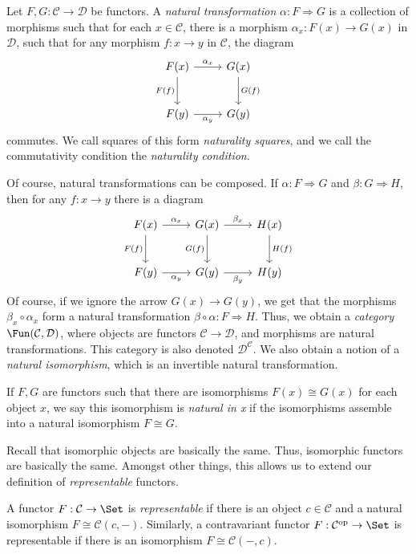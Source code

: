 \documentclass[11pt, A4]{article}
\begin{document}
\begin{definition}\label{5.1}
	Let $F,G : \mathcal{C}  \to \mathcal{D} $ be functors. A \emph{natural transformation} $\alpha : F \Rightarrow G$ is a collection of morphisms such that for each $x\in \mathcal{C} $, there is a morphism $\alpha _x : F(x) \to G(x)$ in $\mathcal{D} $, such that for any morphism $f : x \to y$ in $\mathcal{C} $, the diagram
	\[\begin{tikzcd}[row sep = 2.5em, column sep = 2.5em]
	F(x)\ar[" \alpha _x ", r] \ar[" F(f) "', d]  & G(x)\ar[" G(f) ", d]  \\
	F(y)\ar[" \alpha _y "', r]  & G(y)
	\end{tikzcd}\]
	commutes. We call squares of this form \emph{naturality squares}, and we call the commutativity condition the \emph{naturality condition}.
\end{definition}
Of course, natural transformations can be composed. If $\alpha : F \Rightarrow G$ and $\beta : G \Rightarrow H$, then for any $f : x \to y$ there is a diagram
\[\begin{tikzcd}[row sep = 2.5em, column sep = 2.5em]
F(x)\ar[" \alpha _x ", r] \ar[" F(f) "', d]  & G(x)\ar[" \beta _x ", r] \ar[" G(f) "', d]  & H(x)\ar[" H(f) ", d]  \\
F(y)\ar[" \alpha _y "', r]  & G(y)\ar[" \beta _y "', r]  & H(y)
\end{tikzcd}\]
Of course, if we ignore the arrow $G(x)\to G(y)$, we get that the morphisms $\beta _x \circ \alpha _x$ form a natural transformation $\beta \circ \alpha : F \Rightarrow H$. Thus, we obtain a \emph{category} $\Fun(\mathcal{C} ,\mathcal{D} )$, where objects are functors $\mathcal{C} \to \mathcal{D} $, and morphisms are natural transformations. This category is also denoted $\mathcal{D} ^\mathcal{C} $. We also obtain a notion of a \emph{natural isomorphism}, which is an invertible natural transformation.

If $F,G$ are functors such that there are isomorphisms $F(x)\cong G(x)$ for each object $x$, we say this isomorphism is \emph{natural in x} if the isomorphisms assemble into a natural isomorphism $F\cong G$.

Recall that isomorphic objects are basically the same. Thus, isomorphic functors are basically the same. Amongst other things, this allows us to extend our definition of \emph{representable} functors.

\begin{definition}\label{5.2}
	A functor $F : \mathcal{C}  \to \Set $ is \emph{representable} if there is an object $c\in \mathcal{C} $ and a natural isomorphism $F\cong \mathcal{C} (c,-)$. Similarly, a contravariant functor $F : \mathcal{C} ^{\mathrm{op}}  \to \Set $ is representable if there is an isomorphism $F\cong \mathcal{C} (-,c)$.
\end{definition}
\end{document}
